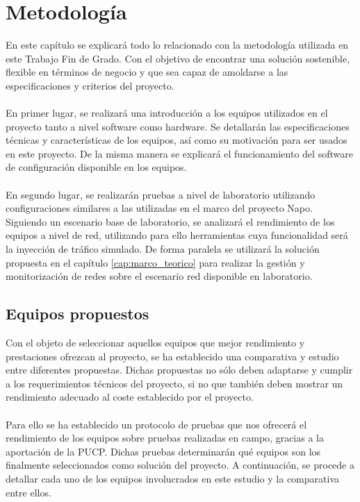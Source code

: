 \chapter{Metodología}
\label{cap:metodologia}
En este capítulo se explicará todo lo relacionado con la metodología utilizada en este Trabajo Fin de Grado. Con el objetivo de encontrar una solución sostenible, flexible en términos de negocio y que sea capaz de amoldarse a las especificaciones y criterios del proyecto.\\\\

En primer lugar, se realizará una introducción a los equipos utilizados en el proyecto tanto a nivel software como hardware. Se detallarán las especificaciones técnicas y características de los equipos, así como su motivación para ser usados en este proyecto. De la misma manera se explicará el funcionamiento del software de configuración disponible en los equipos.\\\\

En segundo lugar, se realizarán pruebas a nivel de laboratorio utilizando configuraciones similares a las utilizadas en el marco del proyecto Napo. Siguiendo un escenario base de laboratorio, se analizará el rendimiento de los equipos a nivel de red, utilizando para ello herramientas cuya funcionalidad será la inyección de tráfico simulado. De forma paralela se utilizará la solución propuesta en el capítulo \ref{cap:marco_teorico} para realizar la gestión y monitorización de redes sobre el escenario red disponible en laboratorio.

\section{Equipos propuestos}
Con el objeto de seleccionar aquellos equipos que mejor rendimiento y prestaciones ofrezcan al proyecto, se ha establecido una comparativa y estudio entre diferentes propuestas. Dichas propuestas no sólo deben adaptarse y cumplir a los requerimientos técnicos del proyecto, si no que también deben mostrar un rendimiento adecuado al coste establecido por el proyecto.\\\\

Para ello se ha establecido un protocolo de pruebas que nos ofrecerá el rendimiento de los equipos sobre pruebas realizadas en campo, gracias a la aportación de la PUCP. Dichas pruebas determinarán qué equipos son los finalmente seleccionados como solución del proyecto. A continuación, se procede a detallar cada uno de los equipos involucrados en este estudio y la comparativa entre ellos.

